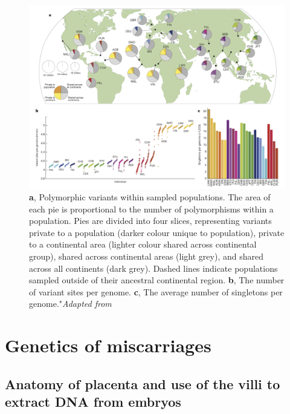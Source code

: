 

\begin{figure}[H]
\centering
\includegraphics[width=1\textwidth]{fig/1000genome_grid.png}
\decoRule
\caption{\textbf{a}, Polymorphic variants within sampled populations. The area of each pie is proportional to the number of polymorphisms within a population. Pies are divided into four slices, representing variants private to a population (darker colour unique to population), private to a continental area (lighter colour shared across continental group), shared across continental areas (light grey), and shared across all continents (dark grey). Dashed lines indicate populations sampled outside of their ancestral continental region. \textbf{b}, The number of variant sites per genome. \textbf{c}, The average number of singletons per genome."\textit{Adapted from} \cite{1000genome2015global}}
\label{fig:1000genome_grid}
\end{figure}


\section{Genetics of miscarriages }

\subsection{Anatomy of placenta and use of the villi to extract DNA from embryos}

